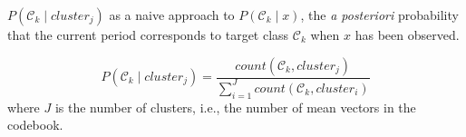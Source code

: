 \documentclass[a5paper,12pt]{article}
\begin{document}
\pagestyle{empty}

$P(\mathcal{C}_k \mid cluster_{j})$
as a naive approach to
$P(\mathcal{C}_k \mid x)$,
the \emph{a posteriori} probability that
the current period corresponds to target class $\mathcal{C}_k$
when $x$ has been observed.

\[
P(\mathcal{C}_k \mid cluster_{j}) = \frac{count(\mathcal{C}_k,cluster_{j})}{\sum_{i=1}^{J} count(\mathcal{C}_k,cluster_{i})}
\]
where $J$ is the number of clusters, i.e., the number of mean vectors in the codebook.
\end{document}
